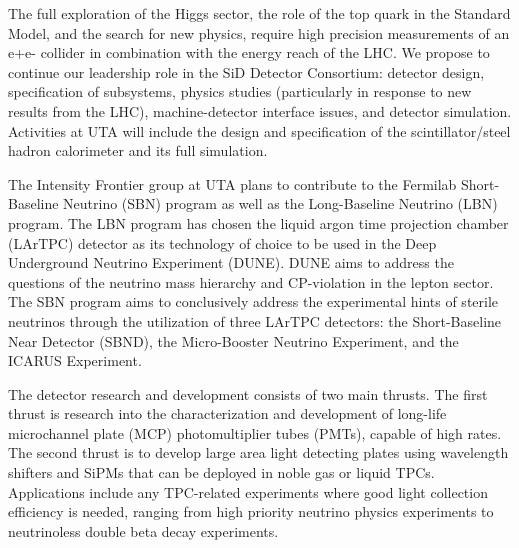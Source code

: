 \documentclass[preprint,11pt]{article}
\begin{document}
The full exploration of the Higgs sector, the role of the top quark in the Standard Model, and the search for new physics, require high precision measurements of an e+e- collider in combination with the energy reach of the LHC. We propose to continue our leadership role in the SiD Detector Consortium: detector design, specification of subsystems, physics studies (particularly in response to new results from the LHC), machine-detector interface issues, and detector simulation. Activities at UTA will include the design and specification of the scintillator/steel hadron calorimeter and its full simulation. 

The Intensity Frontier group at UTA plans to contribute to the Fermilab Short-Baseline Neutrino (SBN) program as well as the Long-Baseline Neutrino (LBN) program. The LBN program has chosen the liquid argon time projection chamber (LArTPC) detector as its technology of choice to be used in the Deep Underground Neutrino Experiment (DUNE).  DUNE aims to address the questions of the neutrino mass hierarchy and CP-violation in the lepton sector. The SBN program aims to conclusively address the experimental hints of sterile neutrinos through the utilization of three LArTPC detectors: the Short-Baseline Near Detector (SBND), the Micro-Booster Neutrino Experiment, and the ICARUS Experiment.

The detector research and development consists of two main thrusts. The first thrust is research into the characterization and development of long-life microchannel plate (MCP) photomultiplier tubes (PMTs), capable of high rates. The second thrust is to develop large area light detecting plates using wavelength shifters and SiPMs that can be deployed in noble gas or liquid TPCs.  Applications include any TPC-related experiments where good light collection efficiency is needed, ranging from high priority neutrino physics experiments to neutrinoless double beta decay experiments.
\end{document}
